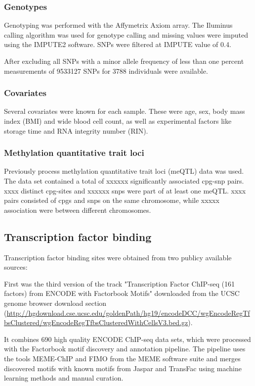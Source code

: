 \documentclass[a4paper,12pt]{article}
\begin{document}
\subsubsection{Genotypes}
Genotyping was performed with the Affymetrix Axiom array. The Iluminus calling algorithm was used for genotype calling and missing values were imputed using the IMPUTE2 software\cite{10.1371/journal.pgen.1000529}. SNPs were filtered at IMPUTE value of 0.4. 

After excluding all SNPs with a minor allele frequency of less than one percent measurements of 9533127 SNPs for 3788 individuals were available. 

\subsubsection{Covariates}
Several covariates were known for each sample. These were age, sex, body mass index (BMI) and wide blood cell count, as well as experimental factors like storage time and RNA integrity number (RIN).

\subsubsection{Methylation quantitative trait loci}
Previously process methylation quantitative trait loci (meQTL) data was used. The data set contained a total of xxxxxx significantly associated cpg-snp pairs. 
xxxx distinct cpg-sites and xxxxxx snps were part of at least one meQTL. xxxx pairs consisted of cpgs and snps on the same chromosome, while xxxxx association were between different chromosomes. 

\subsection{Transcription factor binding}
Transcription factor binding sites were obtained from two publicy available sources: 

First was the third version of the track "Transcription Factor ChIP-seq (161 factors) from ENCODE with Factorbook Motifs"\cite{10.1101/gr.139105.112} downloaded from the UCSC genome browser download section (\url{http://hgdownload.cse.ucsc.edu/goldenPath/hg19/encodeDCC/wgEncodeRegTfbsClustered/wgEncodeRegTfbsClusteredWithCellsV3.bed.gz}).

It combines 690 high quality ENCODE ChIP-seq data sets, which were processed with the Factorbook motif discovery and annotation pipeline\cite{10.1101/gr.139105.112}. The pipeline uses the tools MEME-ChIP\cite{10.1093/bioinformatics/btr189} and FIMO\cite{10.1093/bioinformatics/btr064} from the MEME software suite and merges discovered motifs with known motifs from Jaspar\cite{10.1093/nar/gkx1126} and TransFac\cite{10.1093/nar/gkj143} using machine learning methods and manual curation. 
\end{document}
